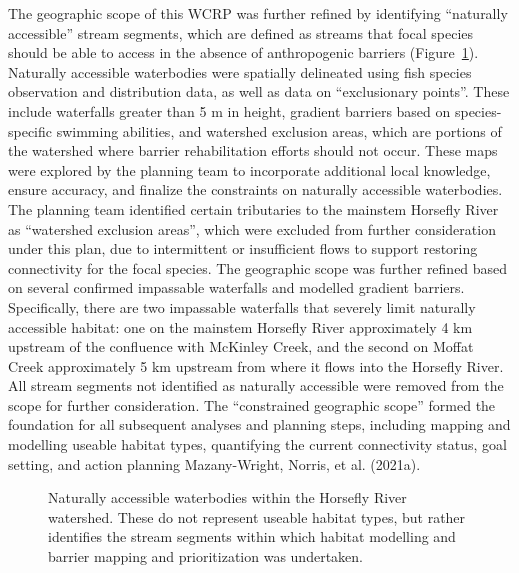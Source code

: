 \documentclass[
  letterpaper,
  DIV=11,
  numbers=noendperiod]{scrreprt}
\begin{document}
The geographic scope of this WCRP was further refined by identifying
``naturally accessible'' stream segments, which are defined as streams
that focal species should be able to access in the absence of
anthropogenic barriers (Figure~\ref{fig-strseg}). Naturally accessible
waterbodies were spatially delineated using fish species observation and
distribution data, as well as data on ``exclusionary points''. These
include waterfalls greater than 5 m in height, gradient barriers based
on species-specific swimming abilities, and watershed exclusion areas,
which are portions of the watershed where barrier rehabilitation efforts
should not occur. These maps were explored by the planning team to
incorporate additional local knowledge, ensure accuracy, and finalize
the constraints on naturally accessible waterbodies. The planning team
identified certain tributaries to the mainstem Horsefly River as
``watershed exclusion areas'', which were excluded from further
consideration under this plan, due to intermittent or insufficient flows
to support restoring connectivity for the focal species. The geographic
scope was further refined based on several confirmed impassable
waterfalls and modelled gradient barriers. Specifically, there are two
impassable waterfalls that severely limit naturally accessible habitat:
one on the mainstem Horsefly River approximately 4 km upstream of the
confluence with McKinley Creek, and the second on Moffat Creek
approximately 5 km upstream from where it flows into the Horsefly River.
All stream segments not identified as naturally accessible were removed
from the scope for further consideration. The ``constrained geographic
scope'' formed the foundation for all subsequent analyses and planning
steps, including mapping and modelling useable habitat types,
quantifying the current connectivity status, goal setting, and action
planning Mazany-Wright, Norris, et al. (2021a).

\begin{figure}


\caption{\label{fig-strseg}Naturally accessible waterbodies within the
Horsefly River watershed. These do not represent useable habitat types,
but rather identifies the stream segments within which habitat modelling
and barrier mapping and prioritization was undertaken.}

\end{figure}%
\end{document}
